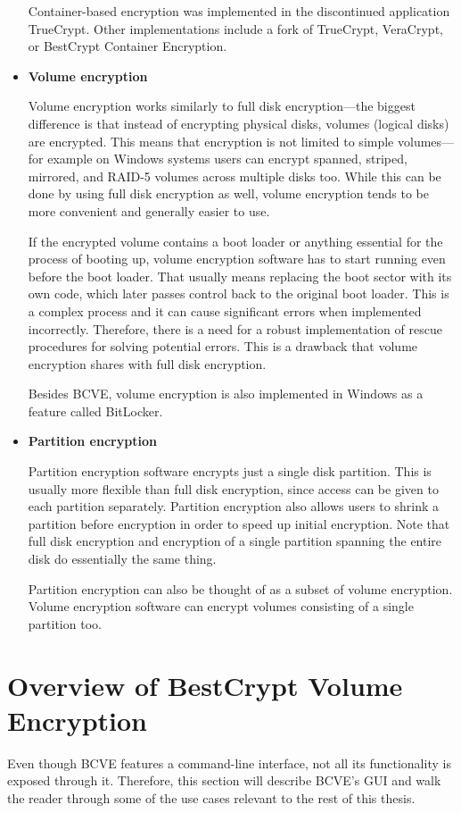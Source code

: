 \documentclass[thesis=B,english]{FITthesis}[2012/10/20]
\begin{document}
\begin{itemize}
		Container-based encryption was implemented in the discontinued application TrueCrypt. Other implementations include a fork of TrueCrypt, VeraCrypt, or  BestCrypt Container Encryption. 
		
		\item \textbf{Volume encryption}
		
		Volume encryption works similarly to full disk encryption---the biggest difference is that instead of encrypting physical disks, volumes (logical disks) are encrypted. This means that encryption is not limited to simple volumes---for example on Windows systems users can encrypt spanned, striped, mirrored, and RAID-5 volumes across multiple disks too. While this can be done by using full disk encryption as well, volume encryption tends to be more convenient and generally easier to use.
		
		If the encrypted volume contains a boot loader or anything essential for the process of booting up, volume encryption software has to start running even before the boot loader. That usually means replacing the boot sector with its own code, which later passes control back to the original boot loader. This is a complex process and it can cause significant errors when implemented incorrectly. Therefore, there is a need for a robust implementation of rescue procedures for solving potential errors. This is a drawback that volume encryption shares with full disk encryption.
		
		Besides BCVE, volume encryption is also implemented in Windows as a feature called BitLocker.
		
		\item \textbf{Partition encryption}
		
		Partition encryption software encrypts just a single disk partition. This is usually more flexible than full disk encryption, since access can be given to each partition separately. Partition encryption also allows users to shrink a partition before encryption in order to speed up initial encryption. Note that full disk encryption and encryption of a single partition spanning the entire disk do essentially the same thing.
		
		Partition encryption can also be thought of as a subset of volume encryption. Volume encryption software can encrypt volumes consisting of a single partition too.
	\end{itemize}
	
	\section{Overview of BestCrypt Volume Encryption}
	Even though BCVE features a command-line interface, not all its functionality is exposed through it. Therefore, this section will describe BCVE's GUI and walk the reader through some of the use cases relevant to the rest of this thesis. 
	
\end{document}

